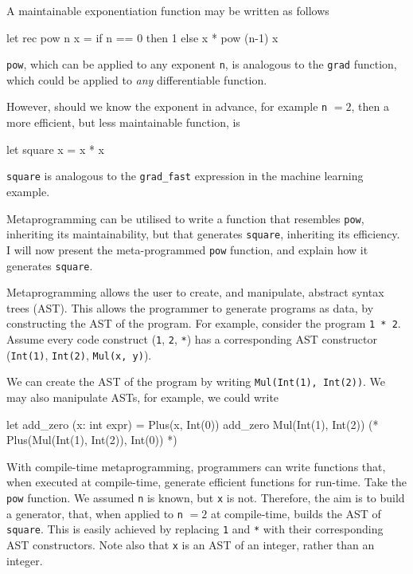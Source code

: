 A maintainable exponentiation function may be written as follows
\begin{ocaml}
let rec pow n x = if n == 0 then 1 else x * pow (n-1) x
\end{ocaml}
\texttt{pow}, which can be applied to any exponent \texttt{n}, is analogous to the \texttt{grad} function, which could be applied to \textit{any} differentiable function. 

However, should we know the exponent in advance, for example \texttt{n} $ = 2$, then a more efficient, but less maintainable function, is 
\begin{ocaml}
let square x = x * x
\end{ocaml}
\texttt{square} is analogous to the \texttt{grad_fast} expression in the machine learning example.

Metaprogramming can be utilised to write a function that resembles \texttt{pow}, inheriting its maintainability, but that generates \texttt{square}, inheriting its efficiency. I will now present the meta-programmed \texttt{pow} function, and explain how it generates \texttt{square}.


Metaprogramming allows the user to create, and manipulate, abstract syntax trees (AST). This allows the programmer to generate programs as data, by constructing the AST of the program. For example, consider the program \texttt{1 * 2}. Assume every code construct (\texttt{1}, \texttt{2}, \texttt{*}) has a corresponding AST constructor (\texttt{Int(1)}, \texttt{Int(2)}, \texttt{Mul(x, y)}). 

We can create the AST of the program by writing \texttt{Mul(Int(1), Int(2))}. We may also manipulate ASTs, for example, we could write

\begin{macocaml}
let add_zero (x: int expr) = Plus(x, Int(0))
add_zero Mul(Int(1), Int(2)) (* Plus(Mul(Int(1), Int(2)), Int(0)) *)
\end{macocaml}

With compile-time metaprogramming, programmers can write functions that, when executed at compile-time,  generate efficient functions for run-time. Take the \texttt{pow} function. We assumed \texttt{n} is known, but \texttt{x} is not. Therefore, the aim is to build a generator, that, when applied to \texttt{n} $=2$ at compile-time, builds the AST of \texttt{square}. This is easily achieved by replacing \texttt{1} and \texttt{*} with their corresponding AST constructors. Note also that \texttt{x} is an AST of an integer, rather than an integer.

